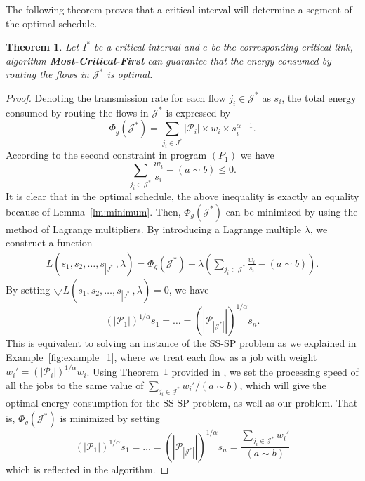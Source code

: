 \documentclass[10pt, conference, compsocconf]{IEEEtran}
\newtheorem{theorem}{Theorem}
\begin{document}
The following theorem proves that a critical interval will determine a segment of the optimal schedule.
\begin{theorem}
\label{thm:interval-opt}
Let $I^*$ be a critical interval and $e$ be the corresponding critical link, algorithm \textbf{Most-Critical-First} can guarantee that the energy consumed by routing the flows in $\mathcal{J}^*$ is optimal.
\end{theorem}
\begin{proof}
Denoting the transmission rate for each flow $j_i \in \mathcal{J}^*$ as $s_i$, the total energy consumed by routing the flows in $\mathcal{J}^*$ is expressed by
\begin{equation}
\Phi_g(\mathcal{J}^*) = \sum_{j_i \in J^*} |\mathcal{P}_i| \times w_i \times s_i^{\alpha-1}. 
\end{equation}
According to the second constraint in program $(P_1)$ we have
\begin{equation}
\sum_{j_i \in \mathcal{J}^*} \frac{w_i}{s_i} -(a \sim b) \leq 0. 
\end{equation}
It is clear that in the optimal schedule, the above inequality is exactly an equality because of Lemma~\ref{lm:minimum}. Then, $\Phi_g(\mathcal{J}^*)$ can be minimized by using the method of Lagrange multipliers. By introducing a Lagrange multiple $\lambda$, we construct a function
\begin{equation}
\begin{aligned}
L(s_1,s_2,\ldots,s_{|J^*|},\lambda) = \Phi_g(\mathcal{J}^*) + \lambda (\sum_{j_i \in \mathcal{J}^*} \frac{w_i}{s_i} -(a \sim b)). 
\end{aligned}
\end{equation}
By setting $\bigtriangledown L(s_1,s_2,\ldots,s_{|J^*|},\lambda) = 0$, we have
\begin{equation}
\left( |\mathcal{P}_1|\right)^{1/\alpha}s_1 = \ldots = \left( |\mathcal{P}_{|\mathcal{J}^*|}|\right)^{1/\alpha}s_n.
\end{equation}
This is equivalent to solving an instance of the SS-SP problem as we explained in Example~\ref{fig:example_1}, where we treat each flow as a job with weight $w_i' = (|\mathcal{P}_i|)^{1/\alpha}w_i$. Using Theorem~$1$ provided in \cite{Yao_Demers_Shenker-YDS-1995}, we set the processing speed of all the jobs to the same value of $\sum_{j_i \in \mathcal{J}^*}w_i' / (a\sim b)$, which will give the optimal energy consumption for the SS-SP problem, as well as our problem. That is, $\Phi_g(\mathcal{J}^*)$ is minimized by setting
\begin{equation}
\left( |\mathcal{P}_1|\right)^{1/\alpha}s_1 = \ldots = \left( |\mathcal{P}_{|\mathcal{J}^*|}|\right)^{1/\alpha}s_n = \frac{\sum_{j_i \in \mathcal{J}^*}w_i'}{ (a\sim b)} 
\end{equation}
which is reflected in the algorithm.
\end{proof}
\end{document}
